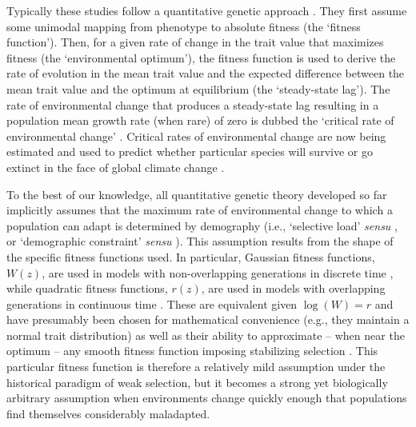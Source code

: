 \documentclass[12pt,letterpaper]{article} %
\begin{document}
Typically these studies follow a quantitative genetic approach \citep[for alternatives see][]{Johansson2008,Bertram2016,Osmond2017}.
They first assume some unimodal mapping from phenotype to absolute fitness (the `fitness function').
Then, for a given rate of change in the trait value that maximizes fitness (the `environmental optimum'), the fitness function is used to derive the rate of evolution in the mean trait value and the expected difference between the mean trait value and the optimum at equilibrium (the `steady-state lag').
The rate of environmental change that produces a steady-state lag resulting in a population mean growth rate (when rare) of zero is dubbed the `critical rate of environmental change' \citep[][]{Lynch1991}.
Critical rates of environmental change are now being estimated and used to predict whether particular species will survive or go extinct in the face of global climate change \citep{Aitken2008,Willi2009,Gienapp2013,Vedder2013}.

To the best of our knowledge, all quantitative genetic theory developed so far implicitly assumes that the maximum rate of environmental change to which a population can adapt is determined by demography (i.e., `selective load' \textit{sensu} \citealt{Lynch1993}, or `demographic constraint' \textit{sensu} \citealt{Gomulkiewicz2009}). 
This assumption results from the shape of the specific fitness functions used.
In particular, Gaussian fitness functions, $W(z)$, are used in models with non-overlapping generations in discrete time \citep{Charlesworth1993c,Burger1995,Burger1997,Burger1999a,Gomulkiewicz2009,Chevin2010,Matuszewski2015,Marshall2016}, while quadratic fitness functions, $r(z)$, are used in models with overlapping generations in continuous time \citep{Pease1989,Lynch1991,Lynch1993,Polechova2009,Aguilee2016}.
These are equivalent given $\log(W)=r$ \citep[][Chapter 1]{Crow1970} and have presumably been chosen for mathematical convenience (e.g., they maintain a normal trait distribution) as well as their ability to approximate -- when near the optimum -- any smooth fitness function imposing stabilizing selection \citep[][]{Lande1976}.
This particular fitness function is therefore a relatively mild assumption under the historical paradigm of weak selection, but it becomes a strong yet biologically arbitrary assumption when environments change quickly enough that populations find themselves considerably maladapted.
\end{document}
